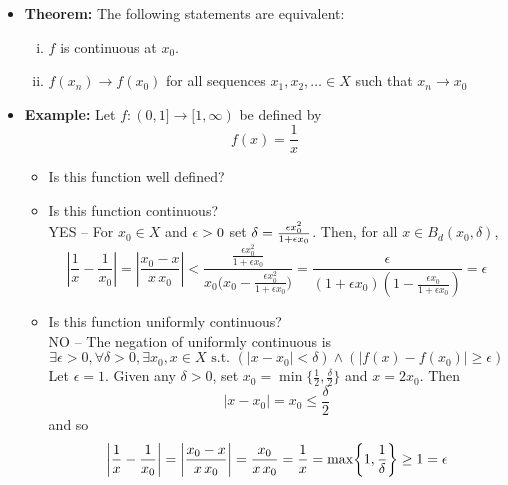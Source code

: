 \documentclass[11pt,twoside]{report}
\newcommand{\bbR}{{\mathbb{R}}}
\begin{document}
\begin{itemize}
\begin{itemize}
\item   $f$ is \textbf{Lipchitz continuous}  on $A \subseteq X$ if there exists a constant $L \in \bbR$ such that
\[
d_Y(f(x), f(x')) \le L d_X(x,x') \quad \text{for all $x,x' \in A$}
\]

\end{itemize}




\item \textbf{Theorem:} The following statements are equivalent: 
\begin{enumerate}[(i)]
\item  $f$ is continuous at $x_0$. 
\item  $f(x_n) \to f(x_0)$ for all sequences $x_1,x_2,\ldots  \in X$ such that $x_n \to x_0$
\end{enumerate}

\item \textbf{Example:} Let $f \colon (0,1] \to [1,\infty)$ be defined by
\[
f(x) = \frac{1}{x} 
\]
\begin{itemize}
\item Is this function well defined?

\item Is this function continuous?\\

YES -- For $x_0 \in X$ and $\epsilon  >0$ set $\delta = \frac{ \epsilon x_0^2}{ 1 + \epsilon x_0}$. Then, for all $x \in B_d(x_0, \delta)$,  
  \[ \left| \frac{1}{x}-\frac{1}{x_0} \right| = \left| \frac{x_0 - x}{x \, x_0} \right| < \frac{\frac{\epsilon x_0^2}{1+\epsilon x_0}}{x_0 \big( x_0 - \frac{\epsilon x_0^2}{1+\epsilon x_0} \big)} = \frac{\epsilon}{(1+\epsilon x_0)( 1 - \frac{\epsilon x_0}{1+\epsilon x_0})} = \epsilon\] 

\item Is this function uniformly continuous? \\

NO -- The negation of uniformly continuous is
 \[
 \exists \epsilon >0, \forall \delta >0, \exists x_0, x  \in X \text{ s.t. }  ( |x-x_0|<\delta )  \wedge   ( |f(x)-f(x_0)|\ge \epsilon)
  \]
Let $\epsilon = 1$. Given any  $\delta > 0$, set $x_0 = \min\big\{ \frac{1}{2},\frac{\delta}{2} \big\}$ and  $x=2 x_0$.  Then 
\[
| x - x_0 | = x_0 \leq \frac{\delta}{2}
\]
and so
\[
 \left| \frac{1}{x}-\frac{1}{x_0} \right| = \left| \frac{x_0 - x}{x \, x_0} \right| = \frac{x_0}{x \, x_0} = \frac{1}{x} = \max\left\{1,\frac{1}{\delta}\right\} \ge 1  = \eps
 \]


\end{itemize}
\end{itemize}
\end{document}
